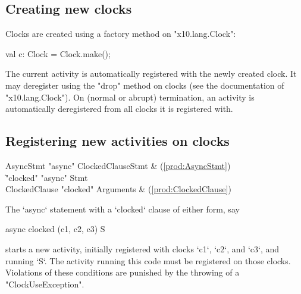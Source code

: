 \subsection{Creating new clocks}\label{sec:clock:create}

Clocks are created using a factory method on \xcd"x10.lang.Clock":


\begin{xten}
val c: Clock = Clock.make();
\end{xten}


The current activity is automatically registered with the newly
created clock.  It may deregister using the \xcd"drop" method on
clocks (see the documentation of \xcd"x10.lang.Clock"). On
(normal or abrupt) termination, an activity is automatically
deregistered from all clocks it is registered with.

\subsection{Registering new activities on clocks}
\label{sec:clock:register}

\begin{bbgrammar}
           AsyncStmt \: \xcd"async" ClockedClause\opt Stmt & (\ref{prod:AsyncStmt}) \\
                     \| \xcd"clocked" \xcd"async" Stmt \\
       ClockedClause \: \xcd"clocked" Arguments & (\ref{prod:ClockedClause}) \\
\end{bbgrammar}

The \xcd`async` statement with a \xcd`clocked` clause of either form, say 
\begin{xten}
  async clocked (c1, c2, c3) S
\end{xten}
starts a new activity, initially registered with
clocks \xcd`c1`, \xcd`c2`, and \xcd`c3`, and  running \xcd`S`. The activity running this code must
be registered on those clocks. 
Violations of these conditions are punished by the throwing of a
\xcd"ClockUseException". 

